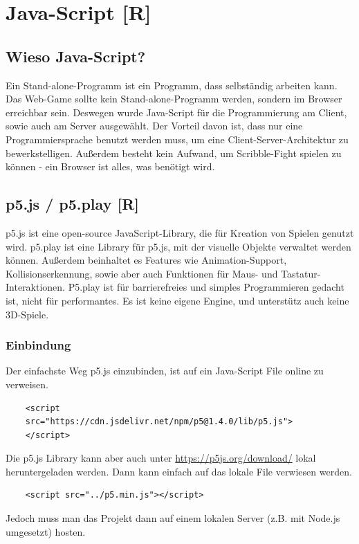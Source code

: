 
\section{Java-Script [R]}
\subsection{Wieso Java-Script?}
Ein Stand-alone-Programm ist ein Programm, dass selbständig arbeiten kann.
Das Web-Game sollte kein Stand-alone-Programm werden, sondern im Browser erreichbar sein. Deswegen wurde Java-Script für die Programmierung am Client, sowie auch am Server ausgewählt.
Der Vorteil davon ist, dass nur eine Programmiersprache benutzt werden muss, um eine Client-Server-Architektur zu bewerkstelligen.
Außerdem besteht kein Aufwand, um Scribble-Fight spielen zu können - ein Browser ist alles, was benötigt wird.
\subsection{p5.js / p5.play [R]}
\label{subsection:p5js}
p5.js ist eine open-source JavaScript-Library, die für Kreation von Spielen genutzt wird.
p5.play ist eine Library für p5.js, mit der visuelle Objekte verwaltet werden können. Außerdem beinhaltet es Features wie Animation-Support,
Kollisionserkennung, sowie aber auch Funktionen für Maus- und Tastatur-Interaktionen.
P5.play ist für barrierefreies und simples Programmieren gedacht ist, nicht für performantes.
Es ist keine eigene Engine, und unterstütz auch keine 3D-Spiele.

\subsubsection{Einbindung}
Der einfachste Weg p5.js einzubinden, ist auf ein Java-Script File online zu verweisen.

\begin{lstlisting}
    <script 
    src="https://cdn.jsdelivr.net/npm/p5@1.4.0/lib/p5.js">
    </script>
\end{lstlisting}
Die p5.js Library kann aber auch
unter \url{https://p5js.org/download/} lokal heruntergeladen werden.
Dann kann einfach auf das lokale File verwiesen werden.

\begin{lstlisting}
    <script src="../p5.min.js"></script>
\end{lstlisting}

Jedoch muss man das Projekt dann auf einem lokalen Server (z.B. mit Node.js umgesetzt) hosten.

